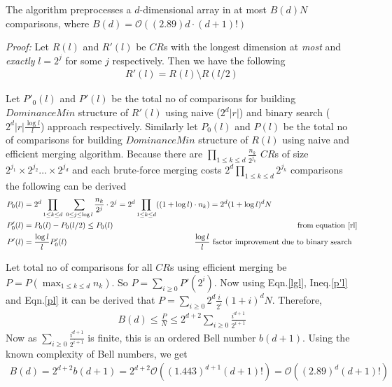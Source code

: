 \begin{theorem}
The algorithm preprocesses a $d$-dimensional array in at most $B(d)N$ comparisons, where $B(d)=\mathcal{O}((2.89)d\cdot(d+1)!)$
\end{theorem}
\emph{Proof:} Let $R(l)$ and $R'(l)$ be $CR$s with the longest dimension at \emph{most} and \emph{exactly} $l=2^j$ for some $j$ respectively. Then we have the following
\begin{align}
\label{rl}
R'(l)=R(l)\setminus R(l/2)
\end{align}\par
Let $P'_0(l)$ and $P'(l)$ be the total no of comparisons for building $DominanceMin$ structure of $R'(l)$ using naive ($2^d\left\vert r\right\vert$) and binary search ($2^d\left\vert r\right\vert\frac{\log l}{l}$) approach respectively. Similarly let $P_0(l)$ and $P(l)$ be the total no of comparisons for building $DominanceMin$ structure of $R(l)$ using naive and efficient merging algorithm. Because there are $\prod_{1\leq k\leq d}\frac{n_k}{2^{j_k}}$ $CR$s of size $2^{j_1}\times 2^{j_2}\ldots \times 2^{j_d}$ and each brute-force merging costs $2^d\prod_{1\leq k\leq d}2^{j_k}$ comparisons the following can be derived
\begin{align}
\label{pl}
P_0(l)&=2^d\prod\limits_{1\leq k\leq d}\;\sum\limits_{0\leq j\leq \log l}\frac{n_k}{2^j}\cdot2^j=2^d\prod\limits_{1\leq k\leq d}((1+\log l)\cdot n_k)=2^d(1+\log l)^dN\\
\label{p'l}
P'_0(l)&=P_0(l)-P_0(l/2) \leq P_0(l) \hspace{233pt}\text { from equation \eqref{rl}}\\
\label{lgl}
P'(l)&=\frac{\log l}{l}P'_0(l) \hspace{160pt}\text { $\frac{\log l}{l}$ factor improvement due to binary search}
\end{align}\par
Let total no of comparisons for all $CR$s using efficient merging be $P=P(\max_{1\leq k\leq d}n_k)$. So $P=\sum_{i\geq 0}P'(2^i)$. Now using Eqn.\eqref{lgl}, Ineq.\eqref{p'l} and Eqn.\eqref{pl} it can be derived that $P=\sum_{i\geq 0}2^d\frac{i}{2^i}(1+i)^dN$. Therefore,
\begin{align}
\label{bd}
B(d)\leq \frac{P}{N} \leq 2^{d+2}\sum\limits_{i\geq 0}\frac{i^{d+1}}{2^{i+1}}
\end{align}
Now as $\sum_{i\geq 0}\frac{i^{d+1}}{2^{i+1}}$ is finite, this is an ordered Bell number $b(d+1)$\cite{p18}. Using the known complexity of Bell numbers, we get
\begin{align}
\label{bd}
B(d)=2^{d+2}b(d+1)=2^{d+2}\mathcal{O}((1.443)^{d+1}(d+1)!) = \mathcal{O}((2.89)^d(d+1)!)
\end{align}